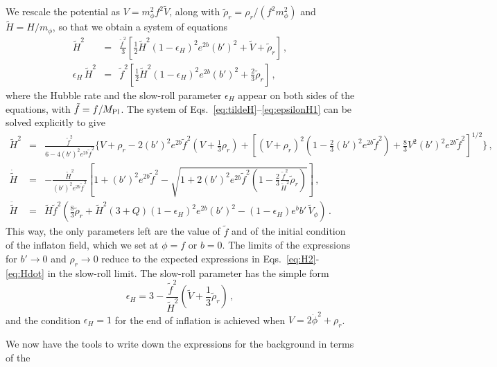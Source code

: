 We rescale the potential as $V = m_\phi^2f^2 \tilde V$, along with $\tilde \rho_r = \rho_r/(f^2m_\phi^2)$ and $\tilde H = H/m_\phi$, so that we obtain a system of equations
\begin{eqnarray}
    \tilde H^2 &=& \frac{\tilde f^2}{3}\left[\frac{1}{2}\tilde H^2(1-\epsilon_H)^2e^{2b}(b')^2 + \tilde V + \tilde \rho_r\right]\,,\label{eq:tildeH}\\
    \epsilon_H\,\tilde H^2 &=& \tilde f^2\left[\frac{1}{2}\tilde H^2(1-\epsilon_H)^2e^{2b}(b')^2 + \frac{2}{3}\tilde\rho_r\right]\,,\label{eq:epsilonH1}
\end{eqnarray}
where the Hubble rate and the slow-roll parameter $\epsilon_H$ appear on both sides of the equations, with $\tilde f = f/M_{\rm Pl}$. The system of Eqs.~\eqref{eq:tildeH}--\eqref{eq:epsilonH1} can be solved explicitly to give
\begin{eqnarray}
    \tilde H^2 &=& \frac{\tilde f^2}{6 - 4(b')^2 e^{2b}\tilde f^2}\bigg\{V \!+\! \rho_r \!-\! 2(b')^2 e^{2 b} \tilde f^2\left(V+\frac{1}{3}\rho_r \right) \!+\! \left[(V+\rho_r)^2\left(1 - \frac{2}{3}(b')^2 e^{2 b} \tilde f^2\right) \!+\! \frac{8}{3}V^2(b')^2 e^{2 b} \tilde f^2\right]^{1/2}\!\bigg\}\,,\label{def:H2}\\
    \dot {\tilde H} &=& -\frac{\tilde H^2}{(b')^2e^{2b}\tilde f^2}\left[1+(b')^2e^{2 b}\tilde f^2 - \sqrt{1 + 2(b')^2 e^{2 b} \tilde f^2 \left(1 - \frac{2}{3}\frac{\tilde f^2}{\tilde H^2} \tilde\rho_r\right)} \right]\,,\label{def:Hdot}\\
    \ddot{\tilde H} &=& \tilde H \tilde f^2 \left(\frac{8}{3}\tilde \rho_r + {\tilde H}^2 (3+Q)(1-\epsilon_H)^2 e^{2b}(b')^2 - (1-\epsilon_H) e^b b'\,\tilde V_\phi\right)\,.
\end{eqnarray}
This way, the only parameters left are the value of $\tilde f$ and of the initial condition of the inflaton field, which we set at $\phi = f$ or $b = 0$. The limits of the expressions for $b' \to 0$ and $\rho_r \to 0$ reduce to the expected expressions in Eqs.~\eqref{eq:H2}-\eqref{eq:Hdot} in the slow-roll limit. The slow-roll parameter has the simple form
\begin{equation}
    \epsilon_H = 3 - \frac{\tilde f^2}{\tilde H^2}\left(\tilde V+\frac{1}{3}\tilde\rho_r\right)\,,
\end{equation}
and the condition $\epsilon_H = 1$ for the end of inflation is achieved when $V = 2\dot\phi^2 +\rho_r$.

We now have the tools to write down the expressions for the background in terms of the 


